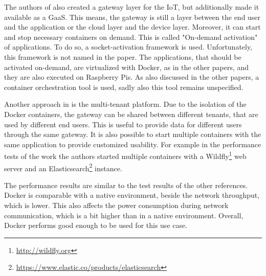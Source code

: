 The authors of \autocite{Morabito:2016} also created a gateway layer for the \ac{IoT}, but additionally made it available as a \ac{GaaS}.
This means, the gateway is still a layer between the end user and the application or the cloud layer and the device layer.
Moreover, it can start and stop necessary containers on demand.
This is called "On-demand activation" of applications.\autocite[cf.][p. 3]{Morabito:2016}
To do so, a socket-activation framework is used.\autocite[cf.][p. 3]{Morabito:2016}
Unfortunately, this framework is not named in the paper.
The applications, that should be activated on-demand, are virtualized with Docker, as in the other papers, and they are also executed on Raspberry Pis.
As also discussed in the other papers, a container orchestration tool is used, sadly also this tool remains unspecified.

Another approach in \autocite{Morabito:2016} is the multi-tenant platform.
Due to the isolation of the Docker containers, the gateway can be shared between different tenants, that are used by different end users.\autocite[cf.][p. 2]{Morabito:2016}
This is useful to provide data for different users through the same gateway.
It is also possible to start multiple containers with the same application to provide customized usability.
For example in the performance tests of the work the authors started multiple containers with a Wildfly\footnote{\url{http://wildfly.org}} web server and an Elasticsearch\footnote{\url{https://www.elastic.co/products/elasticsearch}} instance.\autocite[cf.][p. 2]{Morabito:2016}

The performance results are similar to the test results of the other references.
Docker is comparable with a native environment, beside the network throughput, which is lower.\autocite[cf.][p. 4]{Morabito:2016}
This also affects the power consumption during network communication, which is a bit higher than in a native environment.\autocite[cf.][p. 4]{Morabito:2016}
Overall, Docker performs good enough to be used for this use case.\autocite[cf.][p. 4]{Morabito:2016}

